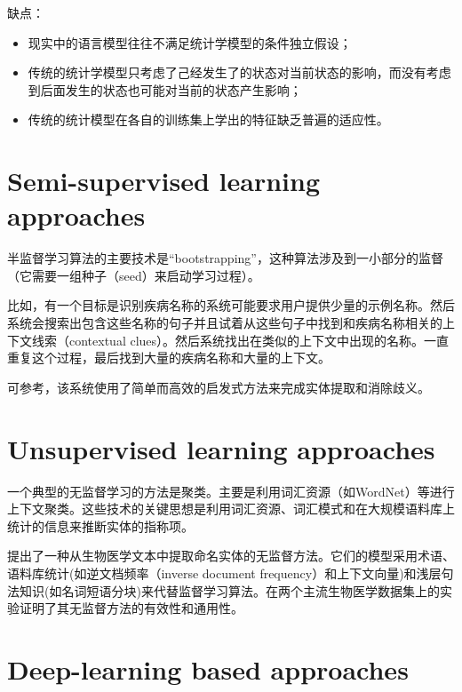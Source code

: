 \documentclass[a4paper,UTF8,no-math]{ctexart}
\begin{document}
	缺点\citep{隋臣2017基于深度学习的中文命名实体识别研究}：
	\begin{itemize}
		\item 现实中的语言模型往往不满足统计学模型的条件独立假设；
		\item 传统的统计学模型只考虑了己经发生了的状态对当前状态的影响，而没有考虑到后面发生的状态也可能对当前的状态产生影响；
		\item 传统的统计模型在各自的训练集上学出的特征缺乏普遍的适应性。
	\end{itemize}
	
	
	\section{Semi-supervised learning approaches}
	
	半监督学习算法的主要技术是“bootstrapping”，这种算法涉及到一小部分的监督（它需要一组种子（seed）来启动学习过程）。
	
	比如，有一个目标是识别疾病名称的系统可能要求用户提供少量的示例名称。然后系统会搜索出包含这些名称的句子并且试着从这些句子中找到和疾病名称相关的上下文线索（contextual clues）。然后系统找出在类似的上下文中出现的名称。一直重复这个过程，最后找到大量的疾病名称和大量的上下文。
	
	可参考\citep{nadeau2006unsupervised}，该系统使用了简单而高效的启发式方法来完成实体提取和消除歧义。
	
	
	
	\section{Unsupervised learning approaches}
	
	一个典型的无监督学习的方法是聚类。主要是利用词汇资源（如WordNet）等进行上下文聚类。这些技术的关键思想是利用词汇资源、词汇模式和在大规模语料库上统计的信息来推断实体的指称项。
	
	\citep{zhang2013unsupervised}提出了一种从生物医学文本中提取命名实体的无监督方法。它们的模型采用术语、语料库统计(如逆文档频率（inverse document frequency）和上下文向量)和浅层句法知识(如名词短语分块)来代替监督学习算法。在两个主流生物医学数据集上的实验证明了其无监督方法的有效性和通用性。 
	
	
	\section{Deep-learning based approaches}
	
\end{document}
